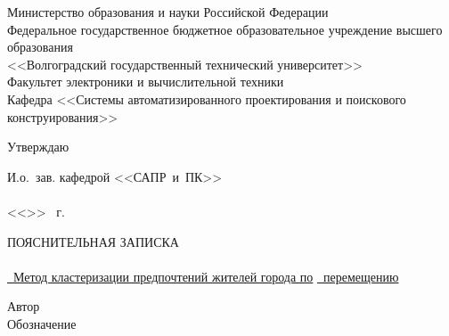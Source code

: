 \begin{titlepage}
    \begin{center}
        Министерство образования и науки Российской Федерации \\
        Федеральное государственное бюджетное образовательное учреждение высшего образования\\
        <<Волгоградский государственный технический университет>>\\
        Факультет электроники и вычислительной техники\\
        Кафедра <<Системы автоматизированного проектирования и поискового конструирования>>
    \end{center}
    \begin{flushright}
        \begin{center}
            \hspace*{9.7em}Утверждаю
        \end{center}
        И.о.~зав. кафедрой <<САПР~и~ПК>>\\
        \hspace{.5cm}\\
        \vspace{.5em}<<\underline{\hspace{2.5em}}>> \underline{\hspace{8.5em}} \the\year\ г.
    \end{flushright}
    \begin{center}
        \large ПОЯСНИТЕЛЬНАЯ ЗАПИСКА\\
            {}\\
        \underline{\ Метод кластеризации предпочтений жителей города по}
        \underline{\ перемещению\hspace{.637\textwidth}}
    \end{center}
    Автор  \quad 
    \\
    Обозначение \UNDER{\underline{\smash{\hspace{6em}\ORDERT\hspace{9.73em}}}}

\end{titlepage}
